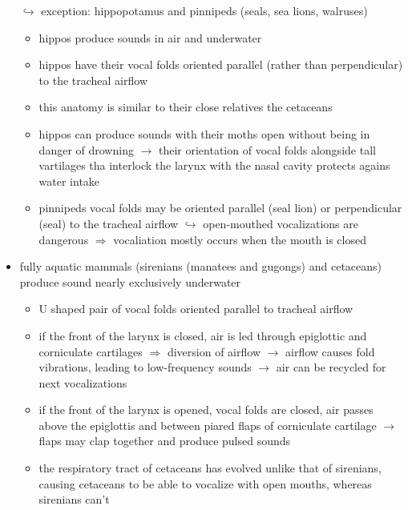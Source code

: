 \documentclass[12pt,a4paper]{article}
\begin{document}
\begin{itemize}
  \newline \indent $\hookrightarrow$ exception: hippopotamus and pinnipeds (seals, sea lions, walruses)
  \begin{itemize}
     \item hippos produce sounds in air and underwater
     \item hippos have their vocal folds oriented parallel (rather than perpendicular) to the tracheal airflow
     \item this anatomy is similar to their close relatives the cetaceans
     \item hippos can produce sounds with their moths open without being in danger of drowning
     \newline \indent $\longrightarrow$ their orientation of vocal folds alongside tall vartilages tha interlock the larynx with the nasal cavity protects agains water intake
     \item pinnipeds vocal folds may be oriented parallel (seal lion) or perpendicular (seal) to the tracheal airflow
     \newline \indent $\hookrightarrow$ open-mouthed vocalizations are dangerous $\Longrightarrow$ vocaliation mostly occurs when the mouth is closed 
   \end{itemize} 
   \item fully aquatic mammals (sirenians (manatees and gugongs) and cetaceans) produce sound nearly exclusively underwater
   \begin{itemize}
     \item U shaped pair of vocal folds oriented parallel to tracheal airflow 
     \item if the front of the larynx is closed, air is led through epiglottic and corniculate cartilages $\Longrightarrow$ diversion of airflow
     \newline \indent $\longrightarrow$ airflow causes fold vibrations, leading to low-frequency sounds
     \newline \indent $\longrightarrow$ air can be recycled for next vocalizations
     \item if the front of the larynx is opened, vocal folds are closed, air passes above the epiglottis and between piared flaps of corniculate cartilage
     \newline \indent $\longrightarrow$ flaps may clap together and produce pulsed sounds
     \item the respiratory tract of cetaceans has evolved unlike that of sirenians, causing cetaceans to be able to vocalize with open mouths, whereas sirenians can't

\end{itemize}
\end{itemize}
\end{document}
